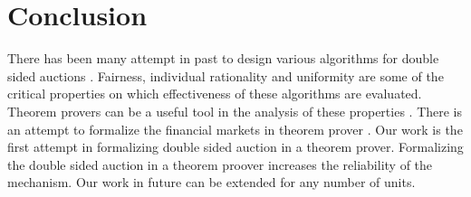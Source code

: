 \documentclass[a4paper,UKenglish,cleveref, autoref]{lipics-v2019}
\begin{document}
\section{Conclusion}\label{sec:conclusion}
There has been many attempt in past to design various algorithms for double sided auctions \cite{Deshmukh:2002:TCD}. Fairness, individual rationality and uniformity are some of the critical properties on which effectiveness of these algorithms are evaluated. Theorem provers can be a  useful  tool in the analysis of these properties \cite{oai:HAL:hal-01673716v1, standLib}. There is an attempt to formalize the financial markets in theorem prover \cite{PassmoreI17}. Our work is the first attempt in formalizing double sided auction in a theorem prover. Formalizing the double sided auction in a theorem proover increases the reliability of the mechanism. Our work in future can be extended for any number of units.  



\end{document}
